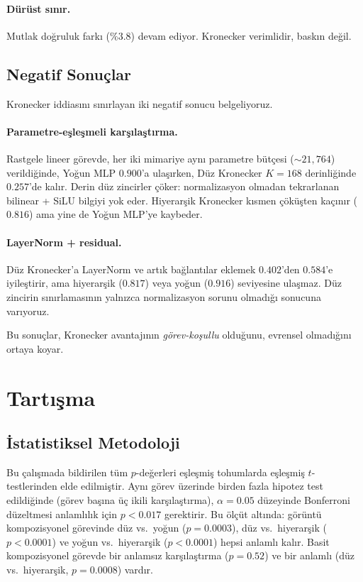 \documentclass[11pt,a4paper]{article}
\begin{document}
\paragraph{Dürüst sınır.}
Mutlak doğruluk farkı ($\%3.8$) devam ediyor. Kronecker verimlidir,
baskın değil.

\subsection{Negatif Sonuçlar}
\label{sec:negatives}

Kronecker iddiasını sınırlayan iki negatif sonucu belgeliyoruz.

\paragraph{Parametre-eşleşmeli karşılaştırma.}
Rastgele lineer görevde, her iki mimariye aynı parametre bütçesi
($\sim 21{,}764$) verildiğinde, Yoğun MLP $0.900$'a ulaşırken, Düz
Kronecker $K=168$ derinliğinde $0.257$'de kalır. Derin düz zincirler
çöker: normalizasyon olmadan tekrarlanan bilinear + SiLU bilgiyi yok eder.
Hiyerarşik Kronecker kısmen çöküşten kaçınır ($0.816$) ama yine de
Yoğun MLP'ye kaybeder.

\paragraph{LayerNorm + residual.}
Düz Kronecker'a LayerNorm ve artık bağlantılar eklemek $0.402$'den
$0.584$'e iyileştirir, ama hiyerarşik ($0.817$) veya yoğun ($0.916$)
seviyesine ulaşmaz. Düz zincirin sınırlamasının yalnızca normalizasyon
sorunu olmadığı sonucuna varıyoruz.

Bu sonuçlar, Kronecker avantajının \emph{görev-koşullu} olduğunu,
evrensel olmadığını ortaya koyar.


\section{Tartışma}
\label{sec:discussion}

\subsection{İstatistiksel Metodoloji}
\label{sec:stats}

Bu çalışmada bildirilen tüm $p$-değerleri eşleşmiş tohumlarda
eşleşmiş $t$-testlerinden elde edilmiştir. Aynı görev üzerinde birden
fazla hipotez test edildiğinde (görev başına üç ikili karşılaştırma),
$\alpha = 0.05$ düzeyinde Bonferroni düzeltmesi anlamlılık için
$p < 0.017$ gerektirir. Bu ölçüt altında: görüntü kompozisyonel
görevinde düz vs.\ yoğun ($p = 0.0003$), düz vs.\ hiyerarşik
($p < 0.0001$) ve yoğun vs.\ hiyerarşik ($p < 0.0001$) hepsi anlamlı
kalır. Basit kompozisyonel görevde bir anlamsız karşılaştırma
($p = 0.52$) ve bir anlamlı (düz vs.\ hiyerarşik, $p = 0.0008$) vardır.
\end{document}
